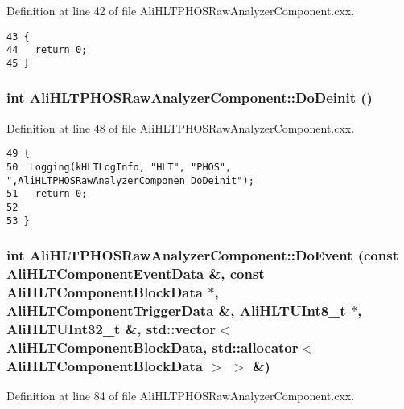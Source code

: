 Definition at line 42 of file Ali\-HLTPHOSRaw\-Analyzer\-Component.cxx.

\footnotesize\begin{verbatim}43 {
44   return 0;
45 }
\end{verbatim}\normalsize 


\subsubsection{\setlength{\rightskip}{0pt plus 5cm}int Ali\-HLTPHOSRaw\-Analyzer\-Component::Do\-Deinit ()\hspace{0.3cm}{\tt  [virtual, inherited]}}\label{classAliHLTPHOSRawAnalyzerComponent_AliHLTPHOSRawAnalyzerPeakFinderComponenta8}




Definition at line 48 of file Ali\-HLTPHOSRaw\-Analyzer\-Component.cxx.

\footnotesize\begin{verbatim}49 {
50  Logging(kHLTLogInfo, "HLT", "PHOS", ",AliHLTPHOSRawAnalyzerComponen DoDeinit");
51   return 0;
52 
53 }
\end{verbatim}\normalsize 


\subsubsection{\setlength{\rightskip}{0pt plus 5cm}int Ali\-HLTPHOSRaw\-Analyzer\-Component::Do\-Event (const Ali\-HLTComponent\-Event\-Data \&, const Ali\-HLTComponent\-Block\-Data $\ast$, Ali\-HLTComponent\-Trigger\-Data \&, Ali\-HLTUInt8\_\-t $\ast$, Ali\-HLTUInt32\_\-t \&, std::vector$<$ Ali\-HLTComponent\-Block\-Data, std::allocator$<$ Ali\-HLTComponent\-Block\-Data $>$ $>$ \&)\hspace{0.3cm}{\tt  [virtual, inherited]}}\label{classAliHLTPHOSRawAnalyzerComponent_AliHLTPHOSRawAnalyzerPeakFinderComponenta12}




Definition at line 84 of file Ali\-HLTPHOSRaw\-Analyzer\-Component.cxx.


